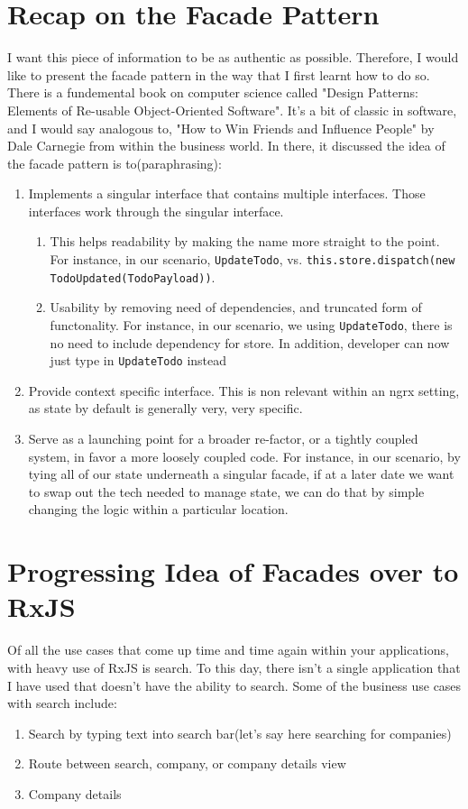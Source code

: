 \section{Recap on the Facade Pattern}
I want this piece of information to be as authentic as possible. Therefore, I would like to present the facade pattern in the way that I first learnt how to do so. There is a fundemental book on computer science called "Design Patterns: Elements of Re-usable Object-Oriented Software". It's a bit of classic in software, and I would say analogous to, "How to Win Friends and Influence People" by Dale Carnegie from within the business world. In there, it discussed the idea of the facade pattern is to(paraphrasing): 
\begin{enumerate}
  \item Implements a singular interface that contains multiple interfaces. Those interfaces work through the singular interface.
  \begin{enumerate}
    \item This helps readability by making the name more straight to the point. For instance, in our scenario, \lstinline{UpdateTodo}, vs. \lstinline{this.store.dispatch(new TodoUpdated(TodoPayload))}. 
    \item Usability by removing need of dependencies, and truncated form of functonality. For instance, in our scenario, we using \lstinline{UpdateTodo}, there is no need to include dependency for store. In addition, developer can now just type in \lstinline{UpdateTodo} instead 
  \end{enumerate}
  \item Provide context specific interface. This is non relevant within an ngrx setting, as state by default is generally very, very specific.
  \item Serve as a launching point for a broader re-factor, or a tightly coupled system, in favor a more loosely coupled code. For instance, in our scenario, by tying all of our state underneath a singular facade, if at a later date we want to swap out the tech needed to manage state, we can do that by simple changing the logic within a particular location. 
\end{enumerate}

\section{Progressing Idea of Facades over to RxJS}



Of all the use cases that come up time and time again within your applications, with heavy use of RxJS is search. To this day, there isn't a single application that I have used that doesn't have the ability to search. Some of the business use cases with search include: 
\begin{enumerate}
  \item Search by typing text into search bar(let's say here searching for companies)
  \item Route between search, company, or company details view 
  \item Company details
\end{enumerate}


